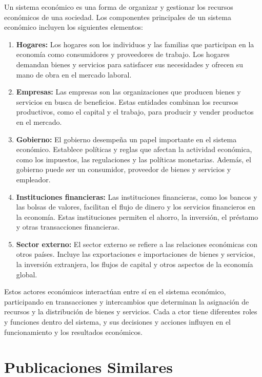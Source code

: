 \documentclass[
  a4paper,
]{article}
\begin{document}
Un sistema económico es una forma de organizar y gestionar los recursos
económicos de una sociedad. Los componentes principales de un sistema
económico incluyen los siguientes elementos:

\begin{enumerate}
\def\labelenumi{\arabic{enumi}.}
\item
  \textbf{Hogares:} Los hogares son los individuos y las familias que
  participan en la economía como consumidores y proveedores de trabajo.
  Los hogares demandan bienes y servicios para satisfacer sus
  necesidades y ofrecen su mano de obra en el mercado laboral.
\item
  \textbf{Empresas:} Las empresas son las organizaciones que producen
  bienes y servicios en busca de beneficios. Estas entidades combinan
  los recursos productivos, como el capital y el trabajo, para producir
  y vender productos en el mercado.
\item
  \textbf{Gobierno:} El gobierno desempeña un papel importante en el
  sistema económico. Establece políticas y reglas que afectan la
  actividad económica, como los impuestos, las regulaciones y las
  políticas monetarias. Además, el gobierno puede ser un consumidor,
  proveedor de bienes y servicios y empleador.
\item
  \textbf{Instituciones financieras:} Las instituciones financieras,
  como los bancos y las bolsas de valores, facilitan el flujo de dinero
  y los servicios financieros en la economía. Estas instituciones
  permiten el ahorro, la inversión, el préstamo y otras transacciones
  financieras.
\item
  \textbf{Sector externo:} El sector externo se refiere a las relaciones
  económicas con otros países. Incluye las exportaciones e importaciones
  de bienes y servicios, la inversión extranjera, los flujos de capital
  y otros aspectos de la economía global.
\end{enumerate}

Estos actores económicos interactúan entre sí en el sistema económico,
participando en transacciones y intercambios que determinan la
asignación de recursos y la distribución de bienes y servicios. Cada a
ctor tiene diferentes roles y funciones dentro del sistema, y sus
decisiones y acciones influyen en el funcionamiento y los resultados
económicos.

\section{Publicaciones Similares}\label{publicaciones-similares}
\end{document}

